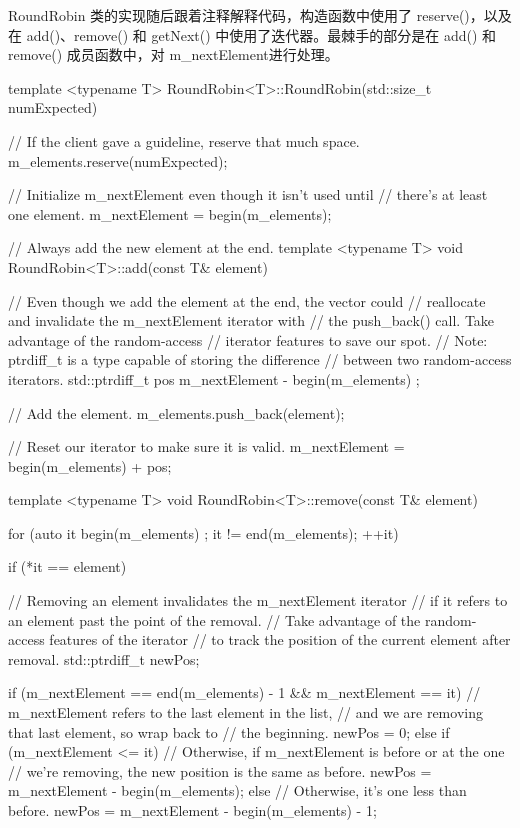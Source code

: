 RoundRobin 类的实现随后跟着注释解释代码，构造函数中使用了 reserve()，以及在 add()、remove() 和 getNext() 中使用了迭代器。最棘手的部分是在 add() 和 remove() 成员函数中，对 m\_nextElement进行处理。

\begin{cpp}
template <typename T> RoundRobin<T>::RoundRobin(std::size_t numExpected)
{
    // If the client gave a guideline, reserve that much space.
    m_elements.reserve(numExpected);

    // Initialize m_nextElement even though it isn't used until
    // there's at least one element.
    m_nextElement = begin(m_elements);
}

// Always add the new element at the end.
template <typename T> void RoundRobin<T>::add(const T& element)
{
    // Even though we add the element at the end, the vector could
    // reallocate and invalidate the m_nextElement iterator with
    // the push_back() call. Take advantage of the random-access
    // iterator features to save our spot.
    // Note: ptrdiff_t is a type capable of storing the difference
    //  between two random-access iterators.
    std::ptrdiff_t pos { m_nextElement - begin(m_elements) };

    // Add the element.
    m_elements.push_back(element);

    // Reset our iterator to make sure it is valid.
    m_nextElement = begin(m_elements) + pos;
}

template <typename T> void RoundRobin<T>::remove(const T& element)
{
    for (auto it { begin(m_elements) }; it != end(m_elements); ++it) {
        if (*it == element) {
            // Removing an element invalidates the m_nextElement iterator
            // if it refers to an element past the point of the removal.
            // Take advantage of the random-access features of the iterator
            // to track the position of the current element after removal.
            std::ptrdiff_t newPos;

            if (m_nextElement == end(m_elements) - 1 &&
                m_nextElement == it) {
                    // m_nextElement refers to the last element in the list,
                    // and we are removing that last element, so wrap back to
                    // the beginning.
                    newPos = 0;
                } else if (m_nextElement <= it) {
                    // Otherwise, if m_nextElement is before or at the one
                    // we're removing, the new position is the same as before.
                    newPos = m_nextElement - begin(m_elements);
                } else {
                    // Otherwise, it's one less than before.
                    newPos = m_nextElement - begin(m_elements) - 1;
                }

}}}
\end{cpp}
